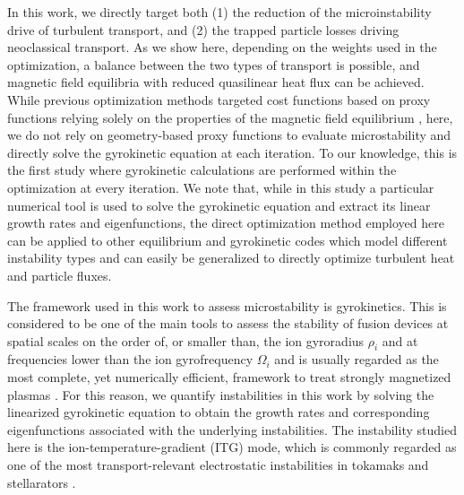\documentclass[prl,twocolumn,amsmath,amssymb,showpacs,superscriptaddress]{revtex4-2}
\begin{document}
In this work, we directly target both (1) the reduction of the microinstability drive of turbulent transport, and (2) the trapped particle losses driving neoclassical transport.
%
As we show here, depending on the weights used {in the optimization}, a balance between the two types of transport is possible, and magnetic field equilibria with reduced quasilinear heat flux can be achieved.
%
While previous optimization methods targeted cost functions based on proxy functions relying solely on the properties of the magnetic field equilibrium \cite{Mynick2010, Xanthopoulos2014, Roberg-Clark2022}, here, we do not rely on {geometry-based} proxy functions to evaluate microstability and directly solve the gyrokinetic equation at each iteration.
%
To our knowledge, this is the first study where gyrokinetic calculations are performed within the optimization at every iteration.
%
We note that, while in this study a particular numerical tool is used to solve the gyrokinetic equation and extract its linear growth rates and eigenfunctions, the direct optimization method employed here can be applied to other equilibrium and gyrokinetic codes which model different instability types and can easily be generalized to directly optimize turbulent heat and particle fluxes.

%

The framework used in this work to assess microstability is gyrokinetics.
%
This is considered to be one of the main tools to assess the stability of fusion devices at spatial scales on the order of, or smaller than, the ion gyroradius $\rho_i$ and at frequencies lower than the ion gyrofrequency $\Omega_i$ \cite{Catto1978a,Antonsen1980,Frieman1980} and is usually regarded as the most complete, yet numerically efficient, framework to treat strongly magnetized plasmas \cite{Helander2021a}.
%
For this reason, we quantify instabilities in this work by solving the linearized gyrokinetic equation to obtain the growth rates and corresponding eigenfunctions associated with the underlying instabilities.
%
The instability studied here is the ion-temperature-gradient (ITG) mode, which is commonly regarded as one of the most transport-relevant electrostatic instabilities in tokamaks and stellarators \cite{Horton1999,Helander2013}.
\end{document}
